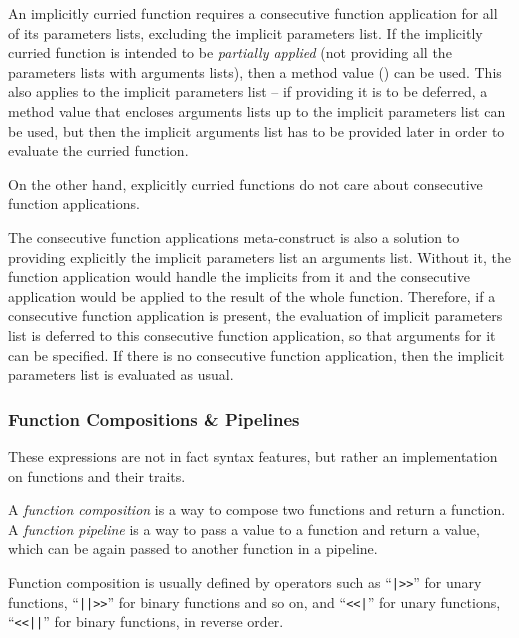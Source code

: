 An implicitly curried function requires a consecutive function application for all of its parameters lists, excluding the implicit parameters list. If the implicitly curried function is intended to be {\em partially applied} (not providing all the parameters lists with arguments lists), then a method value () can be used. This also applies to the implicit parameters list -- if providing it is to be deferred, a method value that encloses arguments lists up to the implicit parameters list can be used, but then the implicit arguments list has to be provided later in order to evaluate the curried function. 

On the other hand, explicitly curried functions do not care about consecutive function applications. 

The consecutive function applications meta-construct is also a solution to providing explicitly the implicit parameters list an arguments list. Without it, the function application would handle the implicits from it and the consecutive application would be applied to the result of the whole function. Therefore, if a consecutive function application is present, the evaluation of implicit parameters list is deferred to this consecutive function application, so that arguments for it can be specified. If there is no consecutive function application, then the implicit parameters list is evaluated as usual. 





\subsubsection{Function Compositions \& Pipelines}
\label{sec:function-compositions}
\label{sec:function-pipelines}

These expressions are not in fact syntax features, but rather an implementation on functions and their traits. 

A {\em function composition} is a way to compose two functions and return a function. A {\em function pipeline} is a way to pass a value to a function and return a value, which can be again passed to another function in a pipeline. 

Function composition is usually defined by operators such as ``\lstinline!|>>!'' for unary functions, ``\lstinline!||>>!'' for binary functions and so on, and ``\lstinline!<<|!'' for unary functions, ``\lstinline!<<||!'' for binary functions, in reverse order. 

